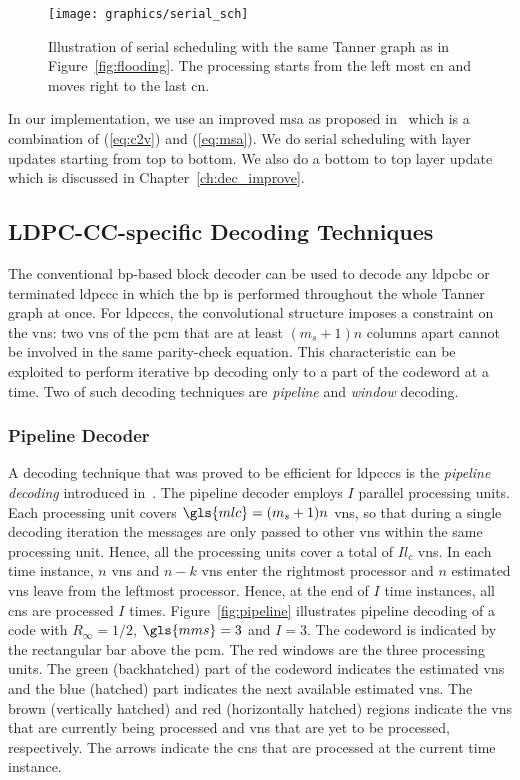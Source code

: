 \begin{figure}[htbp]
  \centering
  \texttt{[image: graphics/serial\_sch]}
  \caption[Illustration of serial scheduling.]{Illustration of serial scheduling with the same Tanner graph as in Figure~\ref{fig:flooding}. The processing starts from the left most \gls{cn} and moves right to the last \gls{cn}.}
  \label{fig:serial_sch}
\end{figure}

In our implementation, we use an improved \gls{msa} as proposed in~\cite{Jones2003} which is a combination of (\ref{eq:c2v}) and (\ref{eq:msa}). We do serial scheduling with layer updates starting from top to bottom. We also do a bottom to top layer update which is discussed in Chapter~\ref{ch:dec_improve}.

\subsection{LDPC-CC-specific Decoding Techniques}
The conventional \gls{bp}-based block decoder can be used to decode any \gls{ldpcbc} or terminated \gls{ldpccc} in which the \gls{bp} is performed throughout the whole Tanner graph at once. For \glspl{ldpccc}, the convolutional structure imposes a constraint on the \glspl{vn}: two \glspl{vn} of the \gls{pcm} that are at least $(m_s+1)n$ columns apart cannot be involved in the same parity-check equation. This characteristic can be exploited to perform iterative \gls{bp} decoding only to a part of the codeword at a time. Two of such decoding techniques are \emph{pipeline} and \emph{window} decoding.
\subsubsection{Pipeline Decoder}
A decoding technique that was proved to be efficient for \glspl{ldpccc} is the \emph{pipeline decoding} introduced in~\cite{Felstrom1999}. The pipeline decoder employs $I$ parallel processing units. Each processing unit covers $\gls{mlc}=(m_s+1)n$ \glspl{vn}, so that during a single decoding iteration the messages are only passed to other \glspl{vn} within the same processing unit. Hence, all the processing units cover a total of $Il_c$ \glspl{vn}. In each time instance, $n$ \glspl{vn} and $n-k$ \glspl{vn} enter the rightmost processor and $n$ estimated \glspl{vn} leave from the leftmost processor. Hence, at the end of $I$ time instances, all \glspl{cn} are processed $I$ times. Figure~\ref{fig:pipeline} illustrates pipeline decoding of a code with $R_\infty=1/2$, $\gls{mms}=3$ and $I=3$. The codeword is indicated by the rectangular bar above the \gls{pcm}. The red windows are the three processing units. The green (backhatched) part of the codeword indicates the estimated \glspl{vn} and the blue (hatched) part indicates the next available estimated \glspl{vn}. The brown (vertically hatched) and red (horizontally hatched) regions indicate the \glspl{vn} that are currently being processed and \glspl{vn} that are yet to be processed, respectively. The arrows indicate the \glspl{cn} that are processed at the current time instance.

